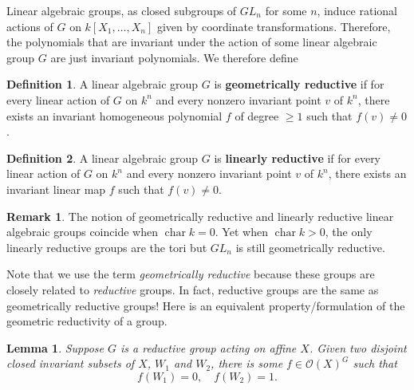 \documentclass[12pt]{article}
\newtheorem{lemma}{Lemma}[section]
\theoremstyle{remark}
\theoremstyle{definition}
\newtheorem{remark}{Remark}[section]
\newtheorem{definition}{Definition}[section]
\begin{document}
    Linear algebraic groups, as closed subgroups of $GL_n$ for some $n$, induce rational actions of $G$ on $k[X_1,\dots, X_n]$ given by coordinate transformations. Therefore, the polynomials that are invariant under the action of some linear algebraic group $G$ are just invariant polynomials. We therefore define
    \begin{definition}
        A linear algebraic group $G$ is \textbf{geometrically reductive} if for every linear action of $G$ on $k^n$ and every nonzero invariant point $v$ of $k^n$, there exists an invariant homogeneous polynomial $f$ of degree $\geqslant 1$ such that $f(v)\neq 0$.
    \end{definition}
    \begin{definition}
        A linear algebraic group $G$ is \textbf{linearly reductive} if for every linear action of $G$ on $k^n$ and every nonzero invariant point $v$ of $k^n$, there exists an invariant linear map $f$ such that $f(v)\neq 0$.
    \end{definition}
    \begin{remark}
        The notion of geometrically reductive and linearly reductive linear algebraic groups coincide when $\operatorname{char} k=0$. Yet when $\operatorname{char} k>0$, the only linearly reductive groups are the tori but $GL_n$ is still geometrically reductive.
    \end{remark}
    Note that we use the term \textit{geometrically reductive} because these groups are closely related to \textit{reductive} groups. In fact, reductive groups are the same as geometrically reductive groups! Here is an equivalent property/formulation of the geometric reductivity of a group.
    \begin{lemma}
        Suppose $G$ is a reductive group acting on affine $X$. Given two disjoint closed invariant subsets of $X$, $W_1$ and $W_2$, there is some $f\in \mathcal O(X)^G$ such that
        \[f(W_1)=0,\quad f(W_2)=1.\]
    \end{lemma}
\end{document}
